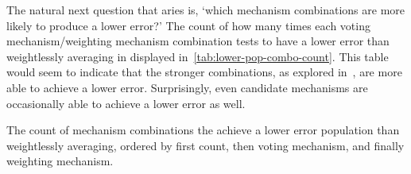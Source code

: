 The natural next question that aries is, `which mechanism combinations are more likely
to produce a lower error?'
The count of how many times each voting mechanism/weighting mechanism combination
tests to have a lower error than weightlessly averaging in displayed
in~\autoref{tab:lower-pop-combo-count}.
This table would seem to indicate that the stronger combinations, as explored
in~, are more able to achieve a lower
error.
Surprisingly, even candidate mechanisms are occasionally able to achieve a lower error
as well.

\begin{table}[htbp]
    \renewcommand{\arraystretch}{1.0}

    \caption{The count of mechanism combinations the achieve a lower error
    population than weightlessly averaging, ordered by first count, then voting
    mechanism, and finally weighting mechanism.}
    \label{tab:lower-pop-combo-count}


\end{table}
